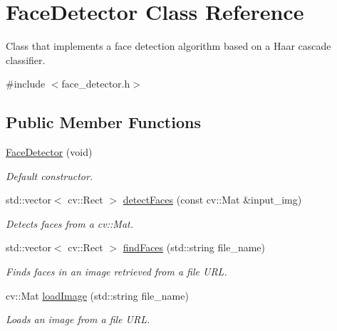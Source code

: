 \hypertarget{classFaceDetector}{\section{Face\-Detector Class Reference}
\label{classFaceDetector}
}


Class that implements a face detection algorithm based on a Haar cascade classifier.  




{\ttfamily \#include $<$face\-\_\-detector.\-h$>$}

\subsection*{Public Member Functions}
\begin{DoxyCompactItemize}
\item 
\hyperlink{classFaceDetector_af08a8c38a26b029e02e05d8d9498332c}{Face\-Detector} (void)
\begin{DoxyCompactList}\small\item\em Default constructor. \end{DoxyCompactList}\item 
std\-::vector$<$ cv\-::\-Rect $>$ \hyperlink{classFaceDetector_abfbe382ac183aff81abe56585cb58f2f}{detect\-Faces} (const cv\-::\-Mat \&input\-\_\-img)
\begin{DoxyCompactList}\small\item\em Detects faces from a cv\-::\-Mat. \end{DoxyCompactList}\item 
std\-::vector$<$ cv\-::\-Rect $>$ \hyperlink{classFaceDetector_a2b337f0b4fb0d0865334c928ac8629ef}{find\-Faces} (std\-::string file\-\_\-name)
\begin{DoxyCompactList}\small\item\em Finds faces in an image retrieved from a file U\-R\-L. \end{DoxyCompactList}\item 
cv\-::\-Mat \hyperlink{classFaceDetector_ad8223498ebc15a177485f86274583d81}{load\-Image} (std\-::string file\-\_\-name)
\begin{DoxyCompactList}\small\item\em Loads an image from a file U\-R\-L. \end{DoxyCompactList}\end{DoxyCompactItemize}
